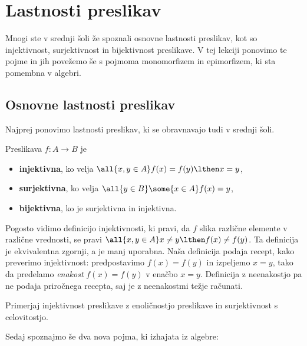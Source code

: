 \chapter{Lastnosti preslikav}
\label{cha:lastnosti-preslikav}

Mnogi ste v srednji šoli že spoznali osnovne lastnosti preslikav, kot so injektivnost, surjektivnost in bijektivnost preslikave. V tej lekciji ponovimo te pojme in jih povežemo še s pojmoma monomorfizem in epimorfizem, ki sta pomembna v algebri.

\section{Osnovne lastnosti preslikav}

Najprej ponovimo lastnosti preslikav, ki se obravnavajo tudi v srednji šoli.

\begin{definicija}
  Preslikava $f : A \to B$ je
  \begin{itemize}
  \item \textbf{injektivna}, ko velja $\all{x, y \in A} f(x) = f(y) \lthen x = y$,
  \item \textbf{surjektivna}, ko velja $\all{y \in B} \some{x \in A} f(x) = y$,
  \item \textbf{bijektivna}, ko je surjektivna in injektivna.
  \end{itemize}
\end{definicija}

\begin{opomba}
  Pogosto vidimo definicijo injektivnosti, ki pravi, da $f$ slika različne elemente v različne vrednosti, se pravi $\all{x, y \in A} x \neq y \lthen f(x) \neq f(y)$. Ta definicija je ekvivalentna zgornji, a je manj uporabna.
  Naša definicija podaja recept, kako preverimo injektivnost: predpostavimo $f(x) = f(y)$ in izpeljemo
  $x = y$, tako da predelamo \emph{enakost} $f(x) = f(y)$ v enačbo $x = y$. Definicija z neenakostjo pa ne
  podaja priročnega recepta, saj je z neenakostmi težje računati.
\end{opomba}

\begin{vaja}
  Primerjaj injektivnost preslikave z enoličnostjo preslikave in surjektivnost s celovitostjo.
\end{vaja}

Sedaj spoznajmo še dva nova pojma, ki izhajata iz algebre:

